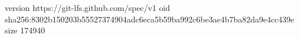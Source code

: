 version https://git-lfs.github.com/spec/v1
oid sha256:8302b150203b55527374904adc6eca5b59ba992c6be3ae4b7ba82da9e4cc439e
size 174940
